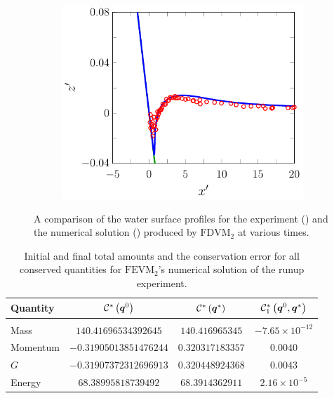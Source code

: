 \begin{figure}
\begin{subfigure}{0.5\textwidth}
		\includegraphics[width=\textwidth]{./chp6/figures/Experiment/Synolakis/H0p0185/FDVM/70s.pdf}
		\vspace{0.5cm}
	\end{subfigure}
	\caption{A comparison of the water surface profiles for the experiment () and the numerical solution ({\color{blue}\solidrule}) produced by $\text{FDVM}_2$ at various times.}
	\label{fig:SynolakisFDVMNoBreak}
\end{figure}

\begin{table}
	\centering
	\begin{tabular}{l  c  c c}
		Quantity& $\mathcal{C}^*\left(\boldsymbol{q}^0\right)$ & $\mathcal{C}^*\left(\boldsymbol{q}^*\right)$ & $\mathcal{C}^*_1\left(\boldsymbol{q}^0,\boldsymbol{q}^*\right)$ \\
		\hline &&& \\
		Mass & $140.41696534392645$ & $140.416965345$ & $-7.65\times 10^{-12}$\\
		Momentum & $-0.31905013851476244$ & $0.320317183357$ & $0.0040$\\
		$G$ & $-0.31907372312696913$ & $0.320448924368$ & $0.0043$\\
		Energy & $68.38995818739492$ & $68.3914362911 $ & $2.16 \times 10^{-5}$ \\
	\end{tabular}
	\caption{Initial and final total amounts and the conservation error for all conserved quantities for $\text{FEVM}_2$'s numerical solution of the runup experiment.}
	\label{tab:ConservationSynFEVM}
\end{table}

